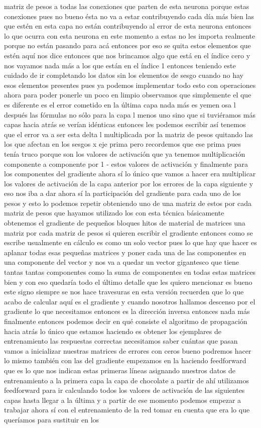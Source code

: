 matriz de pesos a todas las conexiones que parten de esta neurona porque estas conexiones pues no bueno ésta no va a estar contribuyendo cada día más bien las que estén en esta capa no están contribuyendo al error de esta neurona entonces lo que ocurra con esta neurona en este momento a estas no les importa realmente porque no están pasando para acá entonces por eso se quita estos elementos que estén aquí nos dice entonces que nos brincamos algo que está en el índice cero y nos vayamos nada más a los que están en el índice 1 entonces teniendo este cuidado de ir completando los datos sin los elementos de sesgo cuando no hay esos elementos presentes pues ya podemos implementar todo esto con operaciones ahora para poder ponerle un poco en limpio observamos que simplemente el que es diferente es el error cometido en la última capa nada más es yemen osa l después las fórmulas no sólo para la capa l menos uno sino que si tuviéramos más capas hacia atrás se verían idénticas entonces les podemos escribir así tenemos que el error va a ser esta delta l multiplicada por la matriz de pesos quitando las los que afectan en los sesgos x eje prima pero recordemos que ese prima pues tenía truco porque son los valores de activación que ya tenemos multiplicación componente a componente por 1 - estos valores de activación y finalmente para los componentes del gradiente ahora sí lo único que vamos a hacer era multiplicar los valores de activación de la capa anterior por los errores de la capa siguiente y eso nos iba a dar ahora sí la participación del gradiente para cada uno de los pesos y esto lo podemos repetir obteniendo uno de una matriz de estos por cada matriz de pesos que hayamos utilizado los con esta técnica básicamente obtenemos el gradiente de pequeños bloques hitos de material de matrices una matriz por cada matriz de pesos si quieren escribir el gradiente entonces como se escribe usualmente en cálculo es como un solo vector pues lo que hay que hacer es aplanar todas esas pequeñas matrices y poner cada una de las componentes en una componente del vector y nos va a quedar un vector gigantesco que tiene tantas tantas componentes como la suma de componentes en todas estas matrices bien y con eso quedaría todo el último detalle que les quiero mencionar es bueno este signo siempre se nos hace travesuras en esta versión recuerden que lo que acabo de calcular aquí es el gradiente y cuando nosotros hallamos descenso por el gradiente lo que necesitamos entonces es la dirección inversa entonces nada más finalmente entonces podemos decir en qué consiste el algoritmo de propagación hacia atrás lo único que estamos haciendo es obtener los ejemplares de entrenamiento las respuestas correctas necesitamos saber cuántas que pasan vamos a inicializar nuestras matrices de errores con ceros bueno podremos hacer lo mismo también con las del gradiente empezamos en la haciendo feedforward que es lo que nos indican estas primeras líneas asignando nuestros datos de entrenamiento a la primera capa la capa de chocolate a partir de ahí utilizamos feedforward para ir calculando todos los valores de activación de las siguientes capas hasta llegar a la última y a partir de ese momento podemos empezar a trabajar ahora sí con el entrenamiento de la red tomar en cuenta que era lo que queríamos para sustituir en los 